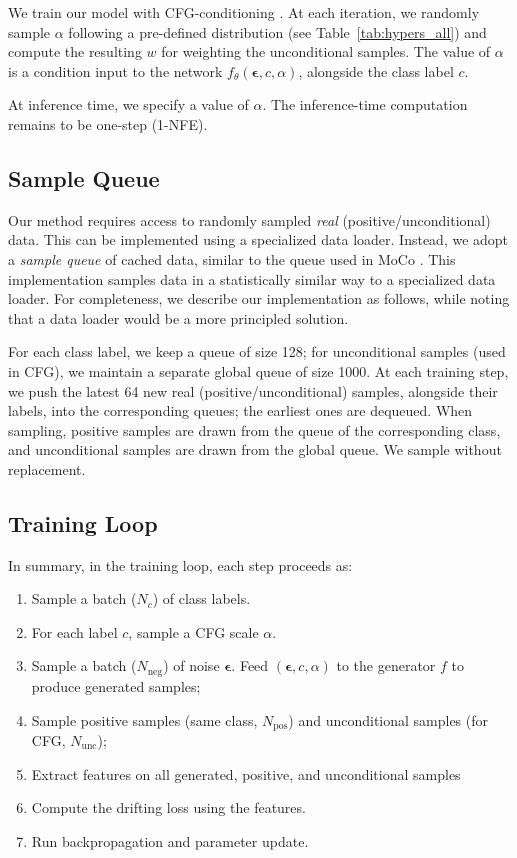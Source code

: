 \documentclass{article}
\newcommand{\e}{{\boldsymbol{\epsilon}}}
\theoremstyle{plain}
\theoremstyle{definition}
\theoremstyle{remark}
\begin{document}
We train our model with CFG-conditioning \cite{geng2025improved}. At each iteration, we randomly sample $\alpha$ following a pre-defined distribution (see Table~\ref{tab:hypers_all}) and compute the resulting $w$ for weighting the unconditional samples. The value of $\alpha$ is a condition input to the network $f_\theta(\e, c, \alpha)$, alongside the class label $c$.

At inference time, we specify a value of $\alpha$. The inference-time computation remains to be one-step (1-NFE).

\subsection{Sample Queue}
\label{sec:appendix_sample_queue}

Our method requires access to randomly sampled \textit{real} (positive/unconditional) data. This can be implemented using a specialized data loader.
Instead, we adopt a \textit{sample queue} of cached data, similar to the queue used in MoCo \cite{he2020momentum}.
This implementation samples data in a statistically similar way to a specialized data loader.
For completeness, we describe our implementation as follows, while noting that a data loader would be a more principled solution.

For each class label, we keep a queue of size 128; for unconditional samples (used in CFG), we maintain a separate global queue of size 1000.
At each training step, we push the latest 64 new real (positive/unconditional) samples, alongside their labels, into the corresponding queues; the earliest ones are dequeued.
When sampling, positive samples are drawn from the queue of the corresponding class, and unconditional samples are drawn from the global queue.
We sample without replacement.

\subsection{Training Loop}
\label{sec:appendix_training_loop}

In summary, in the training loop, each step proceeds as:
\begin{enumerate}[itemsep=2pt, topsep=2pt, parsep=2pt, partopsep=2pt]
    \item Sample a batch ($N_c$) of class labels.
    \item For each label $c$, sample a CFG scale $\alpha$.
    \item Sample a batch ($N_\text{neg}$) of noise $\e$. Feed $(\e, c, \alpha)$ to the generator $f$ to produce generated samples;
    \item Sample positive samples (same class, $N_\text{pos}$) and unconditional samples (for CFG, $N_\text{unc}$);
    \item Extract features on all generated, positive, and unconditional samples
    \item Compute the drifting loss using the features.
    \item Run backpropagation and parameter update.
\end{enumerate}
\end{document}
